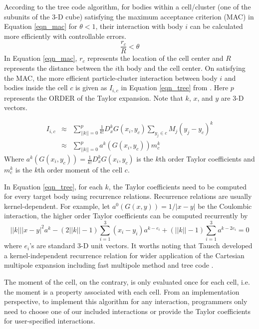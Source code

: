 \documentclass[draftclsnofoot]{elsarticle}
\begin{document}
According to the tree code algorithm, 
for bodies within a cell/cluster (one of the subunits of the 3-D cube) 
satisfying the maximum acceptance criterion (MAC) \cite{mac}  in Equation \ref{eqn_mac} for $\theta < 1$,  
their interaction with body $i$ can be calculated more efficiently with controllable errors. 
\begin{equation}
\label{eqn_mac}
\frac{r_c}{R}<\theta 
\end{equation}
In Equation \ref{eqn_mac}, $r_c$ represents the location of the cell center and $R$ represents the distance between the $i$th body
and the cell center. On satisfying the MAC, the more efficient particle-cluster interaction between body $i$ and bodies inside the cell $c$ is given  as 
$I_{i,c}$ in Equation \ref{eqn_tree} from \cite{krasny1,li,vortex}. Here $p$ represents the ORDER of the Taylor expansion. Note that $k$, $x$, and $y$ are 3-D vectors. 

\begin{eqnarray}
\label{eqn_tree}
I_{i,c} &\approx& \sum\limits_{||k||=0}^{p} \frac{1}{k!}D^{k}_{x}G(x_i,y_c) \sum\limits_{y_j \in c}M_j{(y_j-y_c)}^k\\
\label{eqn_tree2}
&\approx& \sum\limits_{||k||=0}^{p} a^k(G(x_i, y_c))m^k_c
\end{eqnarray}
Where $a^k(G(x_i, y_c))=\frac{1}{k!}D^{k}_{x}G(x_i,y_c)$ is the $k$th order Taylor coefficients and $m^k_c
$ is the $k$th order moment of the cell $c$. 

In Equation \ref{eqn_tree}, for each $k$, the 
Taylor coefficients need to be computed for every target body using recurrence relations. Recurrence relations are usually kernel-dependent. For example, let $a^0(G(x, y))=1/|x-y|$ be the Coulombic interaction, the higher order Taylor coefficients can be computed recurrently by
\begin{equation}
||{k}|| |{ x}-{ y}|^2 a^{ k}-(2||{ k}||-1)
\sum_{i=1}^3 (x_i-y_i)a^{{ k}-{ e}_i}
+ (||{ k}||-1)\sum_{i=1}^3 a^{{ k}-2{ e}_i} = 0\nonumber 
\label{recurrence_1} 
\end{equation}
where $e_i$'s are standard 3-D unit vectors.  It worths noting that Tausch developed a kernel-independent recurrence relation for wider application of the Cartesian multipole expansion including fast multipole method and tree code \cite{tausch}.   


 
The moment of the cell, on the contrary, is only evaluated once for each cell, i.e. the moment is a property associated with each cell. 
From an implementation perspective, to 
implement this algorithm for any interaction, programmers only need to choose one of our included interactions or provide the Taylor coefficients for user-specified interactions. 
\end{document}
